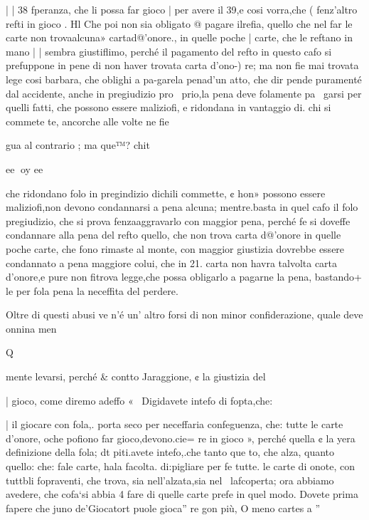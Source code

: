\documentclass[12pt,a6paper]{article}
\begin{document}
 

 

 
 

| | 38
 fperanza, che li possa far gioco
| per avere il 39,e cosi vorra,che
( fenz’altro refti in gioco .
Hl Che poi non sia obligato @
pagare ilrefia, quello che nel
far le carte non trovaalcuna»
cartad@’onore., in quelle poche
| carte, che le reftano in mano
| | sembra giustiflimo, perché il
pagamento del refto in questo
cafo si prefuppone in pene di
non haver trovata carta d’ono-)
re; ma non fie mai trovata lege
cosi barbara, che oblighi a pa-garela penad'un atto, che dir
pende puramenté dal accidente, anche in pregiudizio pro~
prio,la pena deve folamente pa~
garsi per quelli fatti, che possono essere maliziofi, e ridondana
in vantaggio di. chi si commete
te, ancorche alle volte ne fie

gua al contrario ; ma que™?
chit

 

 

 

 

ee
oy ee

che ridondano folo in pregindizio dichili commette, ¢ hon»
possono essere maliziofi,non devono condannarsi a pena alcuna; mentre.basta in quel cafo il
folo pregiudizio, che si prova
fenzaaggravarlo con maggior
pena, perché fe si doveffe condannare alla pena del refto quello, che non trova carta d@’onore
in quelle poche carte, che fono
rimaste al monte, con maggior
giustizia dovrebbe essere condannato a pena maggiore colui,
che in 21. carta non havra talvolta carta d’onore,e pure non
fitrova legge,che possa obligarlo a pagarne la pena, bastando+
le per fola pena la neceffita del
perdere.

Oltre di questi abusi ve n’é un’
altro forsi di non minor confiderazione, quale deve onnina
men
 

 

 
 

Q

mente levarsi, perché & contto
Jaraggione, ¢ la giustizia del

| gioco, come diremo adeffo «
  ~Digidavete intefo di fopta,che:

| il giocare con fola,. porta seco
per neceffaria confeguenza, che:
tutte le carte d’onore, oche
pofiono far gioco,devono.cie=
re in gioco », perché quella ¢ la
yera definizione della fola; dt
piti.avete intefo,.che tanto que
to, che alza, quanto quello: che:
fale carte, hala facolta. di:pigliare per fe tutte. le carte di
onote, con tuttbli fopraventi,
che trova, sia nell’alzata,sia nel~
lafcoperta; ora abbiamo avedere, che cofa‘si abbia 4 fare di
quelle carte prefe in quel modo.
Dovete prima fapere che
juno de’Giocatort puole gioca”
re gon più, O meno cartes a ”
\end{document}
